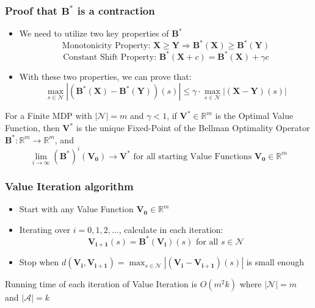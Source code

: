 \documentclass[handout]{beamer}
\newcommand{\bvs}{\bm{V}^*}
\newcommand{\bbs}{\bm{B}^*}
\begin{document}
\begin{frame}
\frametitle{Proof that $\bbs$ is a contraction}
\pause
\begin{itemize}[<+->]
\item We need to utilize two key properties of $\bbs$
$$\text{Monotonicity Property: } \bm{X} \geq \bm{Y} \Rightarrow \bbs(\bm{X}) \geq \bbs(\bm{Y})$$
$$ \text{Constant Shift Property: } \bbs(\bm{X} + c) = \bbs(\bm{X}) + \gamma c$$
\item With these two properties, we can prove that:
$$\max_{s \in \mathcal{N}} |(\bbs(\bm{X}) - \bbs(\bm{Y}))(s)| \leq \gamma \cdot \max_{s\in \mathcal{N}} |(\bm{X} - \bm{Y})(s)|$$
\end{itemize}
\pause
\begin{theorem}
For a Finite MDP with $|\mathcal{N}| = m$ and $\gamma < 1$, if $\bvs \in \mathbb{R}^m$ is the Optimal Value Function, then $\bvs$ is the unique Fixed-Point of the Bellman Optimality Operator $\bbs: \mathbb{R}^m \rightarrow \mathbb{R}^m$, and
$$\lim_{i\rightarrow \infty} (\bbs)^i(\bm{V_0}) \rightarrow \bvs \text{ for all starting Value Functions } \bm{V_0} \in \mathbb{R}^m$$
\label{eq:policy_evaluation_convergence_theorem}
\end{theorem}
\end{frame}

\begin{frame}
\frametitle{Value Iteration algorithm}
\pause
\begin{itemize}[<+->]
\item Start with any Value Function $\bm{V_0} \in \mathbb{R}^m$
\item Iterating over $i = 0, 1, 2, \ldots$, calculate in each iteration:
$$\bm{V_{i+1}}(s) = \bbs(\bm{V_i})(s) \text{ for all } s \in \mathcal{N}$$
\item Stop when $d(\bm{V_i}, \bm{V_{i+1}}) = \max_{s \in \mathcal{N}} |(\bm{V_i} - \bm{V_{i+1}})(s)|$ is small enough
\end{itemize}
\pause
\vspace{5mm}
Running time of each iteration of Value Iteration is $O(m^2 k)$ where $|\mathcal{N}| = m$ and $|\mathcal{A}| = k$
\end{frame}
\end{document}
